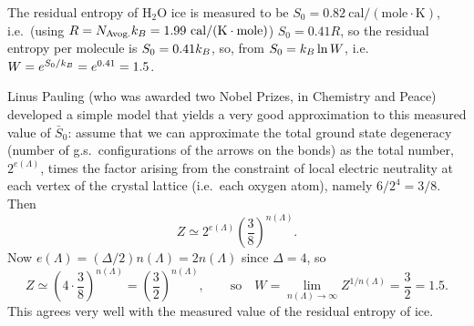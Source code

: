 \begin{diagram}
\end{diagram}

The residual entropy of H$_2$O ice is measured to be
$S_0 = 0.82\ \text{cal}/(\text{mole}\cdot\text{K})$, i.e.\ (using
$R = N_{\text{Avog.}}\kB = 1.99\ \text{cal}/(\text{K}\cdot\text{mole})$) $S_0 = 0.41R$, so
the residual entropy per molecule is $S_0 = 0.41k_{B}$, so, from $S_0 = k_{B}\ln W$, i.e.\
$W = e^{S_0/k_{B}} = e^{0.41} = 1.5$.

Linus Pauling (who was awarded two Nobel Prizes, in Chemistry and Peace) developed a simple
model that yields a very good approximation to this measured value of $\bar S_0$: assume that we
can approximate the total ground state degeneracy (number of g.s.\ configurations of the arrows
on the bonds) as the total number, $2^{e(\Lambda)}$, times the factor arising from the
constraint of local electric neutrality at each vertex of the crystal lattice (i.e.\ each oxygen
atom), namely $6/2^4 = 3/8$. Then
\begin{equation}
  Z\simeq 2^{e(\Lambda)}\left(\frac{3}{8}\right)^{n(\Lambda)}.
\end{equation}
Now $e(\Lambda) = (\Delta/2)n(\Lambda) = 2n(\Lambda)$ since $\Delta = 4$, so
\begin{equation}
  Z\simeq\left(4\cdot\frac{3}{8}\right)^{n(\Lambda)} = \left(\frac{3}{2}\right)^{n(\Lambda)},
  \qquad\text{so}\quad W = \lim_{n(\Lambda)\to\infty}Z^{1/n(\Lambda)} = \frac{3}{2} = 1.5 .
\end{equation}
This agrees very well with the measured value of the residual entropy of ice.

